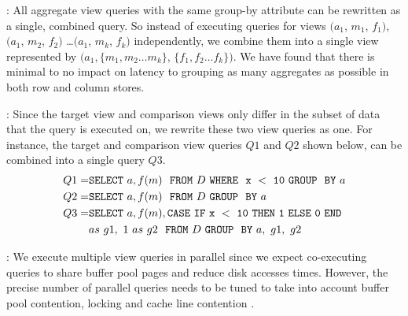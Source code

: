 : All aggregate view queries 
with the same group-by attribute can be 
rewritten as a single, combined query. So instead of executing
queries for views $(a_1$, $m_1$, $f_1)$, $(a_1$, $m_2$, $f_2)$ \ldots $(a_1$, $m_k$, $f_k)$
independently, we combine them into a single view represented by
$(a_1, \{m_1, m_2\ldots m_k\}$, $\{f_1, f_2\ldots f_k\})$.  
We have found that there is minimal to no impact on latency 
to grouping as many aggregates as possible in both row and column stores. 

:
Since the target view and comparison views only differ in the subset of data
that the query is executed on, we rewrite these two view queries as
one. For instance, the target and comparison view queries $Q1$ and $Q2$
shown below, can be combined into a single query $Q3$.
\vspace{-5pt}
\begin{align*} 
Q1 = &{\tt SELECT \ } a, f(m) \ \ {\tt FROM} \  D\  {\tt WHERE \ \ x\ <\ 10\
GROUP \ \ BY} \ a \\
Q2 = &{\tt SELECT \ } a, f(m) \ \ {\tt FROM} \  D\  {\tt GROUP \ \ BY} \ a \\
Q3 = &{\tt SELECT \ } a, f(m), {\tt CASE\ IF\ x\ <\ 10\ THEN\ 1\ ELSE\ 0\
END}\\ 
&as\ g1,\ 1\ as\ g2 \ \ {\tt FROM} \ D\ {\tt GROUP \ \ BY} \ a,\ g1,\ g2
\end{align*}

:
  We execute multiple view queries in parallel since we expect co-executing queries 
  to share buffer pool pages and reduce disk accesses times. 
  However, the precise number of parallel queries needs to be tuned to take into account 
  buffer pool contention, locking and cache line contention \cite{Postgres_wiki}. 



